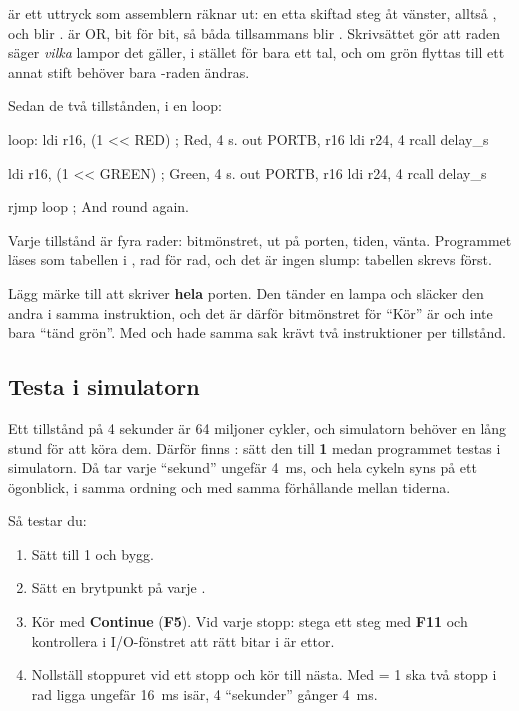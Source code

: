\noindent{} är ett uttryck som assemblern räknar ut: en etta skiftad  steg
åt vänster, alltså , och  blir . \code{|} är
OR, bit för bit, så båda tillsammans blir . Skrivsättet gör att raden säger
\emph{vilka} lampor det gäller, i stället för bara ett tal, och om grön flyttas till ett annat
stift behöver bara -raden ändras.

Sedan de två tillstånden, i en loop:

\begin{asmcode}
loop:
    ldi r16, (1 << RED)             ; Red, 4 s.
    out PORTB, r16
    ldi r24, 4
    rcall delay_s

    ldi r16, (1 << GREEN)           ; Green, 4 s.
    out PORTB, r16
    ldi r24, 4
    rcall delay_s

    rjmp loop                       ; And round again.
\end{asmcode}

\noindent Varje tillstånd är fyra rader: bitmönstret, ut på porten, tiden, vänta. Programmet läses
som tabellen i , rad för rad, och det är ingen slump: tabellen skrevs först.

Lägg märke till att  skriver \textbf{hela} porten. Den tänder en lampa och
släcker den andra i samma instruktion, och det är därför bitmönstret för \enquote{Kör} är
 och inte bara \enquote{tänd grön}. Med  och  hade samma sak
krävt två instruktioner per tillstånd.

\subsection{Testa i simulatorn}
\label{c11:b6}
Ett tillstånd på 4 sekunder är 64 miljoner cykler, och simulatorn behöver en lång stund för att
köra dem. Därför finns : sätt den till \textbf{1} medan programmet testas i
simulatorn. Då tar varje \enquote{sekund} ungefär 4~ms, och hela cykeln syns på ett ögonblick, i
samma ordning och med samma förhållande mellan tiderna.

Så testar du:
\begin{enumerate}
  \item Sätt  till 1 och bygg.
  \item Sätt en brytpunkt på varje .
  \item Kör med \textbf{Continue} (\textbf{F5}). Vid varje stopp: stega ett steg med \textbf{F11}
    och kontrollera i I/O-fönstret att rätt bitar i  är ettor.
  \item Nollställ stoppuret vid ett stopp och kör till nästa. Med  = 1 ska två
    stopp i rad ligga ungefär 16~ms isär, 4 \enquote{sekunder} gånger 4~ms.
\end{enumerate}

